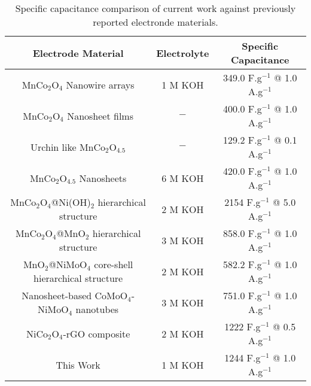 \documentclass[reprint,amsmath,amssymb,aps,floatfix,
]{revtex4-2}
\begin{document}
\begin{table*}
    \caption{\label{tab:table2}Specific capacitance comparison of current work against previously reported electronde materials.}
    \begin{ruledtabular}
    \begin{tabular}{ccc}
    Electrode Material&Electrolyte&Specific Capacitance\\ \hline

    MnCo$_2$O$_4$ Nanowire arrays&1 M KOH&349.0 F.g$^{-1}$ @ 1.0 A.g$^{-1}$\cite{Lihaixiong2014} \\
    MnCo$_2$O$_4$ Nanosheet films&$-$&400.0 F.g$^{-1}$ @ 1.0 A.g$^{-1}$\cite{Nguyen2015} \\
    Urchin like MnCo$_2$O$_{4.5}$&$-$&129.2 F.g$^{-1}$ @ 0.1 A.g$^{-1}$\cite{Wenyao2014} \\
    MnCo$_2$O$_{4.5}$ Nanosheets&6 M KOH&420.0 F.g$^{-1}$ @ 1.0 A.g$^{-1}$\cite{Lei2014} \\
    MnCo$_2$O$_4$@Ni(OH)$_2$ hierarchical structure&2 M KOH&2154 F.g$^{-1}$ @ 5.0 A.g$^{-1}$\cite{Yan2016} \\
    MnCo$_2$O$_4$@MnO$_2$ hierarchical structure&3 M KOH&858.0 F.g$^{-1}$ @ 1.0 A.g$^{-1}$\cite{Xiaoting2016} \\
    MnO$_2$@NiMoO$_4$ core-shell hierarchical structure&2 M KOH&582.2 F.g$^{-1}$ @ 1.0 A.g$^{-1}$\cite{Wang2016} \\
    Nanosheet-based CoMoO$_4$-NiMoO$_4$ nanotubes&3 M KOH&751.0 F.g$^{-1}$ @ 1.0 A.g$^{-1}$\cite{Qing2016} \\
    NiCo$_2$O$_4$-rGO composite&2 M KOH&1222 F.g$^{-1}$ @ 0.5 A.g$^{-1}$\cite{Wangxu2012} \\
    This Work&1 M KOH&1244 F.g$^{-1}$ @ 1.0 A.g$^{-1}$\cite{Mehrez2019} \\
    \end{tabular}
    \end{ruledtabular}
    \end{table*}
\end{document}
